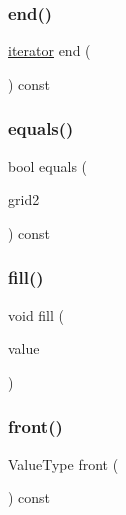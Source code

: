 \mbox{\label{classGrid_a68b688a51bd0cf6fb5bc2cba292209a8}} 
\subsubsection{\texorpdfstring{end()}{end()}}
{\footnotesize\ttfamily \mbox{\hyperlink{classGrid_1_1iterator}{iterator}} end (\begin{DoxyParamCaption}{ }\end{DoxyParamCaption}) const\hspace{0.3cm}{\ttfamily [inline]}}

\mbox{\label{classGrid_a9619d603ca957ce2be5b13198af5ee02}} 
\subsubsection{\texorpdfstring{equals()}{equals()}}
{\footnotesize\ttfamily bool equals (\begin{DoxyParamCaption}\item[{const \mbox{\hyperlink{classGrid}{Grid}}$<$ Value\+Type $>$ \&}]{grid2 }\end{DoxyParamCaption}) const}

\mbox{\label{classGrid_ac8f8ff1a5d0997596cbedbc2162e4649}} 
\subsubsection{\texorpdfstring{fill()}{fill()}}
{\footnotesize\ttfamily void fill (\begin{DoxyParamCaption}\item[{const Value\+Type \&}]{value }\end{DoxyParamCaption})}

\mbox{\label{classGrid_abaa174a9d74f7e7e38d4944fa43b5a33}} 
\subsubsection{\texorpdfstring{front()}{front()}}
{\footnotesize\ttfamily Value\+Type front (\begin{DoxyParamCaption}{ }\end{DoxyParamCaption}) const}

